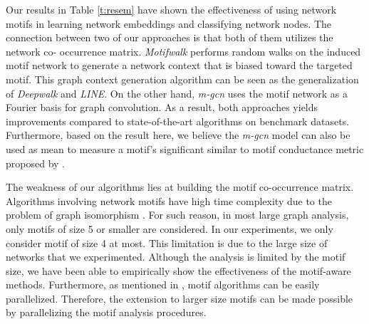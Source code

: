 \documentclass{article}
\theoremstyle{definition}
\begin{document}
Our results in Table \ref{t:resem} have shown the effectiveness of using network 
motifs in learning network embeddings and classifying network nodes. The connection 
between two of our approaches is that both of them utilizes the network co-
occurrence matrix. \emph{Motifwalk} performs random walks on the induced motif 
network to generate a network context that is biased toward the targeted motif. 
This graph context
generation algorithm can be seen as the generalization of \emph{Deepwalk} and
\emph{LINE}. On the other hand, \emph{m-gcn} uses the motif network as a Fourier 
basis for graph convolution. As a result, both approaches yields improvements 
compared to state-of-the-art algorithms on benchmark datasets. Furthermore, based 
on the result here, we believe the \emph{m-gcn} model can also be used as mean to 
measure a motif's significant similar to motif conductance metric proposed by 
\citeauthor{juremotif}.

The weakness of our algorithms lies at building the motif co-occurrence matrix.
Algorithms involving network motifs have high time complexity due to
the problem of graph isomorphism \cite{motifdecrev}. 
For such reason, in most large graph
analysis, only motifs of size 5 or smaller are considered. In our 
experiments, we only consider motif of size 4 at most. This limitation is 
due to the large size of networks that we experimented. Although the
analysis is limited by the motif size, we have been able to empirically 
show the effectiveness of the motif-aware methods. Furthermore, as 
mentioned in \cite{juremotif}, motif algorithms can be easily 
parallelized. Therefore, the extension to larger size motifs can be made 
possible by parallelizing the motif analysis procedures.



\end{document}
